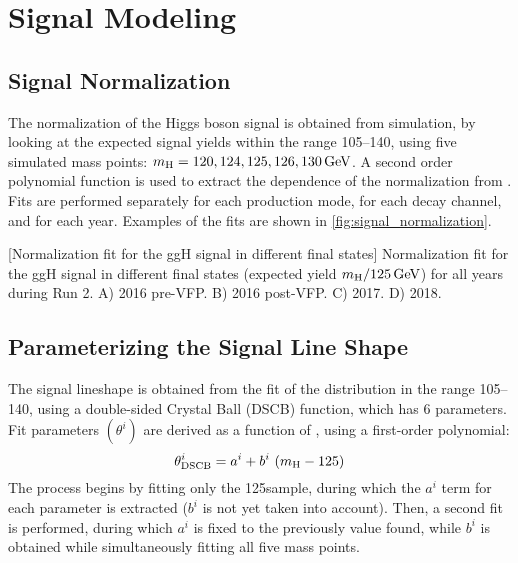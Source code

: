 \section{Signal Modeling}
\label{sec:signal_model}

\subsection{Signal Normalization}
\label{sec:SignalNormalization}
The normalization of the Higgs boson signal is obtained from simulation, 
by looking at the expected signal yields within the range 105--140\GeV, 
using five simulated mass points: $m_{\mathrm{H}} = 120, 124, 125, 126, 130\,\text{Ge\hspace{-.08em}V}$.
A second order polynomial function is used to extract the dependence of the normalization from \mH.
Fits are performed separately for each production mode, for each decay channel, and for each year. 
Examples of the fits are shown in \cref{fig:signal_normalization}.
\begin{multiFigure}
    \centering
        [Normalization fit for the ggH signal in different final states]
        {Normalization fit for the ggH signal in different final states (expected yield \vs $m_{\mathrm{H}} / 125\,\text{Ge\hspace{-.08em}V}$) for all years during Run 2.
        \;A) 2016 pre-VFP.
        \;B) 2016 post-VFP.
        \;C) 2017.
        \;D) 2018.}
    \label{fig:signal_normalization}
\end{multiFigure}

\subsection{Parameterizing the Signal Line Shape}
\label{sec:SignalParametrization}
The signal lineshape is obtained from the fit of the \mfourl distribution in the range 105--140\GeV, using a double-sided Crystal Ball (DSCB) function, which has 6 parameters.
Fit parameters $\left( \theta^i \right)$ are derived as a function of \mH, using a first-order polynomial:
\[
\theta^{i}_\text{DSCB} = a^i + b^{i}~(\mH - 125)%
\]
The process begins by fitting only the 125\GeV sample, during which the $a^i$ term for each parameter is extracted ($b^i$ is not yet taken into account).
Then, a second fit is performed, during which $a^i$ is fixed to the previously value found, while $b^i$ is obtained while simultaneously fitting all five \mH mass points.


